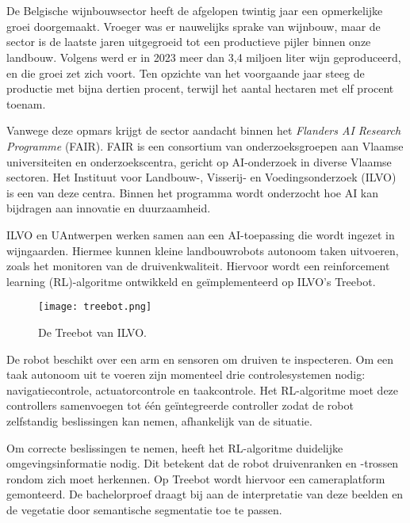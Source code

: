 
\chapter{}%
\label{ch:inleiding}

De Belgische wijnbouwsector heeft de afgelopen twintig jaar een opmerkelijke groei doorgemaakt. Vroeger was er nauwelijks sprake van wijnbouw, maar de sector is de laatste jaren uitgegroeid tot een productieve pijler binnen onze landbouw. Volgens \textcite{FODEconomie2024} werd er in 2023 meer dan 3,4 miljoen liter wijn geproduceerd, en die groei zet zich voort. Ten opzichte van het voorgaande jaar steeg de productie met bijna dertien procent, terwijl het aantal hectaren met elf procent toenam. 

Vanwege deze opmars krijgt de sector aandacht binnen het \textit{Flanders AI Research Programme} (FAIR). FAIR is een consortium van onderzoeksgroepen aan Vlaamse universiteiten en onderzoekscentra, gericht op AI-onderzoek in diverse Vlaamse sectoren. Het Instituut voor Landbouw-, Visserij- en Voedingsonderzoek (ILVO) is een van deze centra. Binnen het programma wordt onderzocht hoe AI kan bijdragen aan innovatie en duurzaamheid.

ILVO en UAntwerpen werken samen aan een AI-toepassing die wordt ingezet in wijngaarden. Hiermee kunnen kleine landbouwrobots autonoom taken uitvoeren, zoals het monitoren van de druivenkwaliteit. Hiervoor wordt een reinforcement learning (RL)-algoritme ontwikkeld en geïmplementeerd op ILVO's Treebot. \begin{figure}
    \centering
    \texttt{[image: treebot.png]}
    \caption[Treebot ILVO.]{\label{fig:treebot}De Treebot van ILVO.}
\end{figure}

De robot beschikt over een arm en sensoren om druiven te inspecteren. Om een taak autonoom uit te voeren zijn momenteel drie controlesystemen nodig: navigatiecontrole, actuatorcontrole en taakcontrole. Het RL-algoritme moet deze controllers samenvoegen tot één geïntegreerde controller zodat de robot zelfstandig beslissingen kan nemen, afhankelijk van de situatie.

Om correcte beslissingen te nemen, heeft het RL-algoritme duidelijke omgevingsinformatie nodig. Dit betekent dat de robot druivenranken en -trossen rondom zich moet herkennen. Op Treebot wordt hiervoor een cameraplatform gemonteerd. De bachelorproef draagt bij aan de interpretatie van deze beelden en de vegetatie door semantische segmentatie toe te passen.

